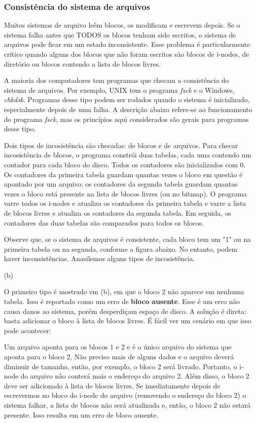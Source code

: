 \documentclass{article}
\newcommand\unix{{\color{red}UNIX} }
\begin{document}
\subsubsection{Consistência do sistema de arquivos}
Muitos sistemas de arquivo leêm blocos, os modificam e escrevem depois. Se o sistema falha antes que TODOS os blocos tenham sido escritos, o sistema de arquivos pode ficar em um estado inconsistente. Esse problema é particularmente crítico quando alguns dos blocos que não foram escritos são blocos de i-nodes, de diretório ou blocos contendo a lista de blocos livres.

A maioria dos computadores tem programas que checam a consistência do sistema de arquivos. Por exemplo, \unix tem o programa \textit{fsck} e o Windows, \textit{chkdsk}. Programas desse tipo podem ser rodados quando o sistema é inicializado, especialmente depois de uma falha. A descrição abaixo refere-se ao funcionamento do programa \textit{fsck}, mas os princípios aqui considerados são gerais para programas desse tipo.

Dois tipos de incosistência são checadas: de blocos e de arquivos. Para checar incosistência de blocos, o programa constrói duas tabelas, cada uma contendo um contador para cada bloco do disco. Todos os contadores são inicializados com 0. Os contadores da primeira tabela guardam quantas vezes o bloco em questão é apontado por um arquivo; os contadores da segunda tabela guardam quantas vezes o bloco está presente na lista de blocos livres (ou no bitmap). O programa varre todos os i-nodes e atualiza os contadores da primeira tabela e varre a lista de blocos livres e atualiza os contadores da segunda tabela. Em seguida, os contadores das duas tabelas são comparados para todos os blocos.

Observe que, se o sistema de arquivos é consistente, cada bloco tem um "1" ou na primeira tabela ou na segunda, conforme a figura abaixo. No entanto, podem haver inconsistências. Anasilemos alguns tipos de incosistência. 

{\color{blue} (b)}

O primeiro tipo é mostrado em (b), em que o bloco 2 não aparece em nenhuma tabela. Isso é reportado como um erro de \textbf{bloco ausente}. Esse é um erro não causa danos ao sistema, porém desperdiçam espaço de disco. A solução é direta: basta adicionar o bloco à lista de blocos livres. É fácil ver um cenário em que isso pode acontecer:

Um arquivo aponta para os blocos 1 e 2 e é o único arquivo do sistema que aponta para o bloco 2, Não preciso mais de alguns dados e o arquivo deverá diminuir de tamanho, então, por exemplo, o bloco 2 será livrado. Portanto, o i-node do arquivo não conterá mais o endereço do arquivo 2. Além disso, o bloco 2 deve ser adicionado à lista de blocos livres. Se imediatamente depois de escrevermos no bloco do i-node do arquivo (removendo o endereço do bloco 2) o sistema falhar, a lista de blocos não será atualizada e, então, o bloco 2 não estará presente. Isso resulta em um erro de bloco ausente. 
\end{document}
